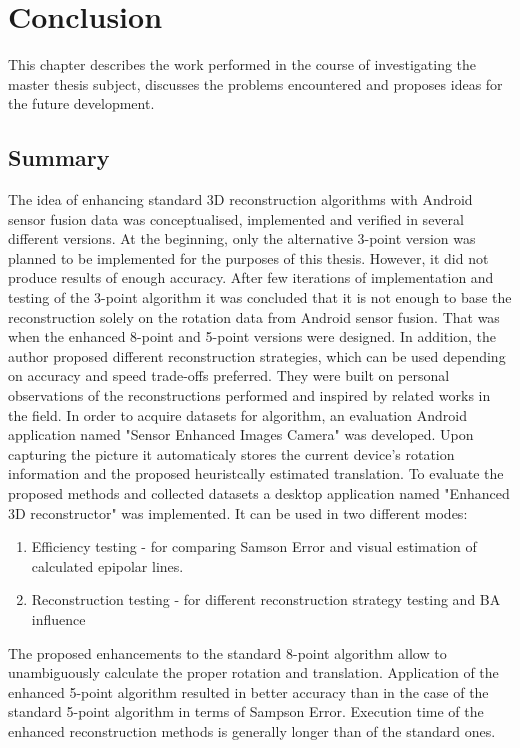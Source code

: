 
\chapter{Conclusion} %
This chapter describes the work performed in the course of investigating the master thesis subject, discusses the problems encountered and proposes ideas for the future development.

\section{Summary}
The idea of enhancing standard 3D reconstruction algorithms with Android sensor fusion data was conceptualised, implemented and verified in several different versions. At the beginning, only the alternative 3-point version was planned to be implemented for the purposes of this thesis. However, it did not produce results of enough accuracy. After few iterations of implementation and testing of the 3-point algorithm it was concluded that it is not enough to base the reconstruction solely on the rotation data from Android sensor fusion. That was when the enhanced 8-point and 5-point versions were designed. In addition, the author proposed different reconstruction strategies, which can be used depending on accuracy and speed trade-offs preferred. They were built on personal observations of the reconstructions performed and inspired by related works in the field.
In order to acquire datasets for algorithm, an evaluation Android application named "Sensor Enhanced Images Camera" was developed. Upon capturing the picture it automaticaly stores the current device's rotation information and the proposed heuristcally estimated translation. 
To evaluate the proposed methods and collected datasets a desktop application named "Enhanced 3D reconstructor" was implemented.
It can be used in two different modes:
\begin{enumerate}
\item Efficiency testing - for comparing  Samson Error and visual estimation of calculated epipolar lines.
\item Reconstruction testing - for different reconstruction strategy testing and BA influence    
\end{enumerate}
The proposed enhancements to the standard 8-point algorithm allow to unambiguously calculate the proper rotation and translation. Application of the enhanced 5-point algorithm resulted in better accuracy than in the case of the standard 5-point algorithm in terms of Sampson Error. Execution time of the enhanced reconstruction methods is generally longer than of the standard ones. 
